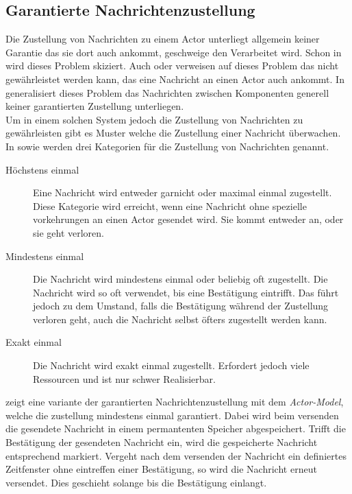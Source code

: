 \subsection{Garantierte Nachrichtenzustellung}\label{sec:actor:patterns:guaranteedDelivery}
Die Zustellung von Nachrichten zu einem Actor unterliegt allgemein keiner Garantie das sie dort auch ankommt, geschweige den Verarbeitet wird. Schon in \cite{Agha1985ConcurrentParallelism} wird dieses Problem skiziert. Auch \cite{Vernon2015ReactiveAkka} oder \cite{CloudComputingPatterns2014} verweisen auf dieses Problem das nicht gewährleistet werden kann, das eine Nachricht an einen Actor auch ankommt. In \cite{CloudComputingPatterns2014} generalisiert dieses Problem das Nachrichten zwischen Komponenten generell keiner garantierten Zustellung unterliegen. \\
Um in einem solchen System jedoch die Zustellung von Nachrichten zu gewährleisten gibt es Muster welche die Zustellung einer Nachricht überwachen. In \cite{messagedeliveryreliabilityakkadocumentation} sowie \cite{hughmckee_2017} werden drei Kategorien für die Zustellung von Nachrichten genannt.
\begin{description}
    \item [Höchstens einmal] Eine Nachricht wird entweder garnicht oder maximal einmal zugestellt. Diese Kategorie wird erreicht, wenn eine Nachricht ohne spezielle vorkehrungen an einen Actor gesendet wird. Sie kommt entweder an, oder sie geht verloren.
    \item [Mindestens einmal] Die Nachricht wird mindestens einmal oder beliebig oft zugestellt. Die Nachricht wird so oft verwendet, bis eine Bestätigung eintrifft. Das führt jedoch zu dem Umstand, falls die Bestätigung während der Zustellung verloren geht, auch die Nachricht selbst öfters zugestellt werden kann.
    \item [Exakt einmal] Die Nachricht wird exakt einmal zugestellt. Erfordert jedoch viele Ressourcen und ist nur schwer Realisierbar.
\end{description}
\cite{Vernon2015ReactiveAkka} zeigt eine variante der garantierten Nachrichtenzustellung mit dem \textit{Actor-Model}, welche die zustellung mindestens einmal garantiert. Dabei wird beim versenden die gesendete Nachricht in einem permantenten Speicher abgespeichert. Trifft die Bestätigung der gesendeten Nachricht ein, wird die gespeicherte Nachricht entsprechend markiert. Vergeht nach dem versenden der Nachricht ein definiertes Zeitfenster ohne eintreffen einer Bestätigung, so wird die Nachricht erneut versendet. Dies geschieht solange bis die Bestätigung einlangt. \\
